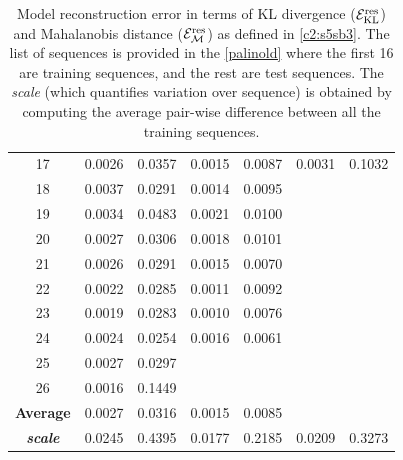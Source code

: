 \begin{table}[H]
\begin{center}
\begin{small}
\begin{tabular}{ c || c c | c c | c c }
\hline
17 & 0.0026 & 0.0357 & 0.0015 & 0.0087 & 0.0031 & 0.1032 \\
18 & 0.0037 & 0.0291 & 0.0014 & 0.0095 \\
19 & 0.0034 & 0.0483 & 0.0021 & 0.0100 \\
20 & 0.0027 & 0.0306 & 0.0018 & 0.0101 \\
21 & 0.0026 & 0.0291 & 0.0015 & 0.0070 \\
22 & 0.0022 & 0.0285 & 0.0011 & 0.0092 \\
23 & 0.0019 & 0.0283 & 0.0010 & 0.0076 \\
24 & 0.0024 & 0.0254 & 0.0016 & 0.0061 \\
25 & 0.0027 & 0.0297 & & \\
26 & 0.0016 & 0.1449 & & \\
\hline
\textbf{Average} & 0.0027 & 0.0316 & 0.0015 & 0.0085 \\
\hline
\hline
\textbf{\textit{scale}}  & 0.0245  &  0.4395 &  0.0177  &  0.2185 &  0.0209  &  0.3273 \\
\hline
\end{tabular}
\end{small}
\end{center}
\centering\caption{
Model reconstruction error in terms of KL divergence (${\mathcal E}_{\text{KL}}^{\text{res}}$) and Mahalanobis distance (${\mathcal E}_{\mathcal{M}}^{\text{res}}$) as defined in \cref{c2:s5sb3}. 
The list of sequences is provided in the \cref{palinold} where the first 16 are training sequences, and the rest are test sequences.
The \textit{scale} (which quantifies variation over sequence) is obtained by computing the average pair-wise difference between all the training sequences.
}
\label{c4:tab1_errors}
\end{table} 

